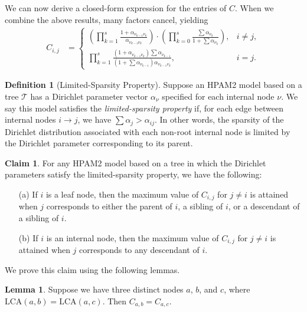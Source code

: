 \documentclass{article}
\theoremstyle{definition}
\newtheorem{lemma}[thm]{Lemma}
\newtheorem{claim}[thm]{Claim}
\newtheorem{defn}[thm]{Definition}
\begin{document}
We can now derive a closed-form expression for the entries of $C$.
When we combine the above results, many factors cancel, yielding
\begin{align}
C_{i,j}
&=
\begin{cases}
\left(
  \prod_{k=1}^s
  \frac { 1 + \alpha_{\nu_{k-1} \nu_k} } { \alpha_{\nu_{k-1} \nu_k} }
\right)
\cdot
\left(
  \prod_{k=0}^s
  \frac { \sum \alpha_{\nu_k} } { 1 + \sum \alpha_{\nu_k} }
\right),
& i \neq j, \\
\prod_{k=1}^s \frac
  { \left( 1 + \alpha_{\nu_{k-1} \nu_k} \right) \sum \alpha_{\nu_{k-1}} }
  { \left( 1 + \sum \alpha_{\nu_{k-1}} \right) \alpha_{\nu_{k-1} \nu_k} },
& i = j.
\end{cases}
\label{eqn:closedFormC}
\end{align}

\begin{defn}[Limited-Sparsity Property]
Suppose an HPAM2 model based on a tree $\mathcal T$ has a Dirichlet parameter vector $\alpha_\nu$ specified for each internal node $\nu$.
We say this model satisfies the \emph{limited-sparsity property} if, for each edge between internal nodes $i \to j$, we have $\sum \alpha_j > \alpha_{ij}$.
In other words, the sparsity of the Dirichlet distribution associated with each non-root internal node is limited by the Dirichlet parameter corresponding to its parent.
\end{defn}

\begin{claim}
For any HPAM2 model based on a tree in which the Dirichlet parameters satisfy the limited-sparsity property, we have the following:
\begin{itemize}
  \item[(a)] If $i$ is a leaf node, then the maximum value of $C_{i,j}$ for $j \neq i$ is attained when $j$ corresponds to either the parent of $i$, a sibling of $i$, or a descendant of a sibling of $i$.
  \item[(b)] If $i$ is an internal node, then the maximum value of $C_{i,j}$ for $j \neq i$ is attained when $j$ corresponds to any descendant of $i$.
\end{itemize}
\label{claim:CMatrixProperty}
\end{claim}

We prove this claim using the following lemmas.

\begin{lemma}
Suppose we have three distinct nodes $a$, $b$, and $c$, where $\text{LCA}(a,b) = \text{LCA}(a,c)$.
Then $C_{a,b} = C_{a,c}$.
\label{lemma:equalLCA}
\end{lemma}
\end{document}
